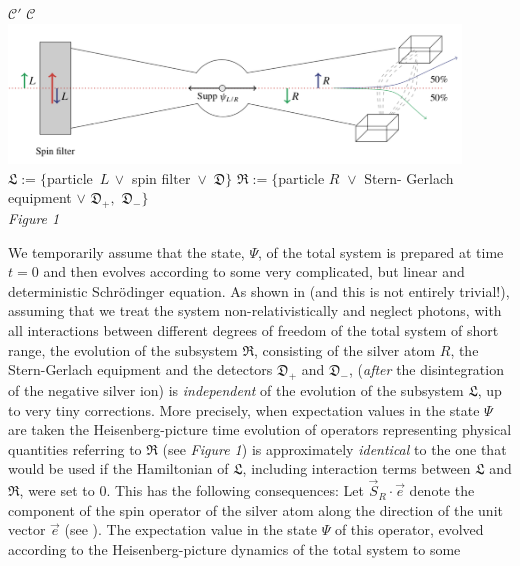 \documentclass[a4paper,11pt]{article}
\begin{document}
\begin{center}
 $\mathcal{C'}$ \hspace{5.2cm} $\mathcal{C}$\\
\includegraphics[width=12cm]{Spin-Filter.png}\\
\small{
$ \mathfrak{L}:=\lbrace$particle\, $L\, \vee $ spin filter\, $\vee$\, $\mathfrak{D} \rbrace$ \hspace{0.5cm} $\mathfrak{R}:=\{$particle $R \,\,\vee$ Stern-
Gerlach equipment $\vee  \,\, \mathfrak{D}_{+}, \,\,\mathfrak{D}_{-}\}$
}\\
\vspace{0.2cm}
\textit{Figure 1}
\end{center}
We temporarily assume that the state, $\Psi$, of the total system is prepared at time $t=0$ and 
then evolves according to some very complicated, but linear and deterministic Schr\"odinger equation. 
As shown in \cite{FFS} (and this is not entirely trivial!), assuming that we treat the system non-relativistically 
and neglect photons, with all interactions between different degrees of freedom of the total system of 
short range, the evolution of the subsystem $\mathfrak{R}$, consisting of the silver atom $R$, 
the Stern-Gerlach equipment and  the detectors $\mathfrak{D}_{+}$ and $\mathfrak{D}_{-}$, (\textit{after} the 
disintegration of the negative silver ion) is \textit{independent} of the evolution of the subsystem $\mathfrak{L}$, 
up to very tiny corrections. More precisely, when expectation values in the state $\Psi$ are taken the Heisenberg-picture 
time evolution of operators representing physical quantities referring to $\mathfrak{R}$ 
 (see \textit{Figure 1}) is approximately \textit{identical} to the one that 
would be used if the Hamiltonian of $\mathfrak{L}$, including interaction terms between $\mathfrak{L}$ and $\mathfrak{R}$, 
were set to 0. This has the following consequences: Let $\vec{S}_{R}\cdot \vec{e}$ denote the component of the spin 
operator of the silver atom along the direction of the unit vector $\vec{e}$ (see \cite{FFS}). The expectation value in 
the state $\Psi$ of this operator, evolved according to the Heisenberg-picture dynamics of the total system to some 
\end{document}
